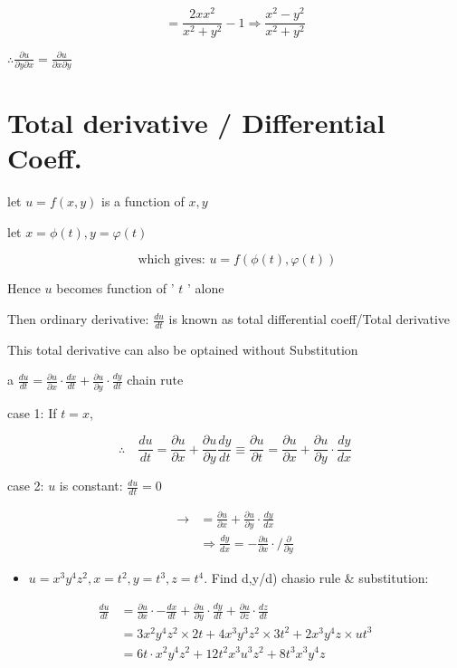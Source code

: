 \documentclass[12pt, a4paper]{article}
\begin{document}
$$
=\frac{2 x x^{2}}{x^{2}+y^{2}}-1 \Rightarrow \frac{x^{2}-y^{2}}{x^{2}+y^{2}}
$$

$\therefore \frac{\partial u}{\partial y \partial x}=\frac{\partial u}{\partial x \partial y}$

\section*{Total derivative / Differential Coeff.}
let $u=f(x, y)$ is a function of $x, y$

let $x=\phi(t), y=\varphi(t)$

$$
\text { which gives: } u=f(\phi(t), \varphi(t))
$$

Hence $u$ becomes function of ' $t$ ' alone

Then ordinary derivative: $\frac{d u}{d t}$ is known as total differential coeff/Total derivative

This total derivative can also be optained without Substitution

a $\frac{d u}{d t}=\frac{\partial u}{\partial x} \cdot \frac{d x}{d t}+\frac{\partial u}{\partial y} \cdot \frac{d y}{d t}$ chain rute

case 1: If $t=x$,

$$
\therefore \quad \frac{d u}{d t}=\frac{\partial u}{\partial x}+\frac{\partial u}{\partial y} \frac{d y}{d t} \equiv \frac{\partial u}{\partial t}=\frac{\partial u}{\partial x}+\frac{\partial u}{\partial y} \cdot \frac{d y}{d x}
$$

case 2: $u$ is constant: $\frac{d u}{d t}=0$

$$
\begin{aligned}
\longrightarrow & =\frac{\partial u}{\partial x}+\frac{\partial u}{\partial y} \cdot \frac{d y}{d x} \\
& \Rightarrow \frac{d y}{d x}=-\frac{\partial u}{\partial x} \cdot / \frac{\partial}{\partial y}
\end{aligned}
$$

\begin{itemize}
  \item $u=x^{3} y^{4} z^{2}, x=t^{2}, y=t^{3}, z=t^{4}$. Find d,y/d) chasio rule \& substitution:
\end{itemize}

$$
\begin{aligned}
\frac{d u}{d t} & =\frac{\partial u}{\partial x} \cdot-\frac{d x}{d t}+\frac{\partial u}{\partial y} \cdot \frac{d y}{d t}+\frac{\partial u}{\partial z} \cdot \frac{d z}{d t} \\
& =3 x^{2} y^{4} z^{2} \times 2 t+4 x^{3} y^{3} z^{2} \times 3 t^{2}+2 x^{3} y^{4} z \times u t^{3} \\
& =6 t \cdot x^{2} y^{4} z^{2}+12 t^{2} x^{3} u^{3} z^{2}+8 t^{3} x^{3} y^{4} z
\end{aligned}
$$
\end{document}
